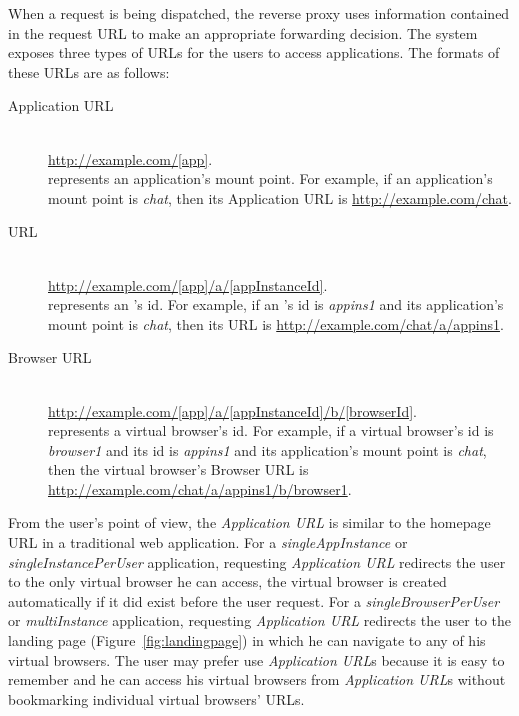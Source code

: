 When a request is being dispatched, the reverse proxy uses information
contained in the request URL to make an appropriate forwarding decision. 
The system exposes three types of URLs for the users to access \cb applications.
The formats of these URLs are as follows:

\begin{description}

\item[Application URL] \label{itm:appurl} \hfill \\
\url{http://example.com/[app]}. \\
\code{[app]} represents an application's mount point. 
For example, if an application's mount point is
\emph{chat},  then its Application URL is \url{http://example.com/chat}.


\item[\appins{} URL] \label{itm:appinsurl} \hfill \\
\url{http://example.com/[app]/a/[appInstanceId]}. \\
 represents an \appins{}'s id.  For example, if an
\appins{}'s id is \emph{appins1} and its application's mount point is
\emph{chat}, then its \appins{} URL is
\url{http://example.com/chat/a/appins1}.


\item[Browser URL] \label{itm:vburl} \hfill \\
\url{http://example.com/[app]/a/[appInstanceId]/b/[browserId]}. \\
\code{[browser\-Id]} represents a virtual browser's id. For example, if a
virtual browser's id is \emph{browser1} and its \appins{} id is 
 \emph{appins1} and its application's mount point is \emph{chat},
  then the virtual browser's Browser URL is 
  \url{http://example.com/chat/a/appins1/b/browser1}.

\end{description}


From the user's point of view, the \emph{Application URL} is similar to  the
homepage URL in a traditional web application. For a \emph{singleAppInstance}
or \emph{singleInstancePerUser} application, requesting \emph{Application URL}
redirects the user to the only virtual browser  he can access, the virtual
browser is created automatically if it did exist before the user request. For
a \emph{singleBrowserPerUser} or \emph{multiInstance} application, requesting
\emph{Application URL} redirects the user to the landing page
(Figure~\ref{fig:landingpage})  in which he can navigate to any of his virtual
browsers. The user may prefer use \emph{Application URL}s because it is easy
to remember and he can access his virtual browsers from \emph{Application
URL}s without bookmarking individual virtual browsers' URLs.

